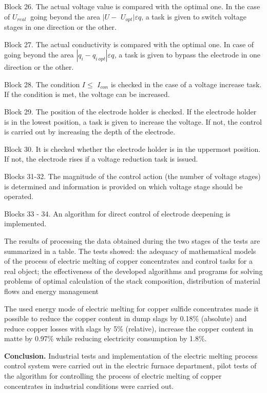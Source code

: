 Block 26. The actual voltage value is compared with the optimal one. In
the case of \(U_{real}\ \) going beyond the area \(|U -\)
\(U_{opt}|\varepsilon q\), a task is given to switch voltage stages in
one direction or the other.

Block 27. The actual conductivity is compared with the optimal one. In
case of going beyond the area
\(|q_{i} - q_{i\ opt}|\varepsilon q\)\emph{,} a task is given to bypass
the electrode in one direction or the other.

Block 28. The condition \(I \leq\) \(I_{con}\) is checked in the case of
a voltage increase task. If the condition is met, the voltage can be
increased.

Block 29. The position of the electrode holder is checked. If the
electrode holder is in the lowest position, a task is given to increase
the voltage. If not, the control is carried out by increasing the depth
of the electrode.

Block 30. It is checked whether the electrode holder is in the uppermost
position. If not, the electrode rises if a voltage reduction task is
issued.

Blocks 31-32. The magnitude of the control action (the number of voltage
stages) is determined and information is provided on which voltage stage
should be operated.

Blocks 33 - 34. An algorithm for direct control of electrode deepening
is implemented.

The results of processing the data obtained during the two stages of the
tests are summarized in a table. The tests showed: the adequacy of
mathematical models of the process of electric melting of copper
concentrates and control tasks for a real object; the effectiveness of
the developed algorithms and programs for solving problems of optimal
calculation of the stack composition, distribution of material flows and
energy management

The used energy mode of electric melting for copper sulfide concentrates
made it possible to reduce the copper content in dump slags by 0.18\%
(absolute) and reduce copper losses with slags by 5\% (relative),
increase the copper content in matte by 0.97\% while reducing
electricity consumption by 1.8\%.

{\bfseries Conclusion.} Industrial tests and implementation of the electric
melting process control system were carried out in the electric furnace
department, pilot tests of the algorithm for controlling the process of
electric melting of copper concentrates in industrial conditions were
carried out.

